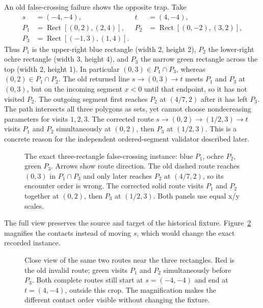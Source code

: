 \documentclass[12pt,a4paper]{article}
\newcommand{\Rect}[2]{\operatorname{Rect}\!\left[#1,#2\right]}
\begin{document}
An old false-crossing failure shows the opposite trap. Take
\[
\begin{aligned}
s&=(-4,-4),&t&=(4,-4),\\
P_1&=\Rect{(0,2)}{(2,4)},&P_2&=\Rect{(0,-2)}{(3,2)},\\
P_3&=\Rect{(-1,3)}{(1,4)}.
\end{aligned}
\]
Thus \(P_1\) is the upper-right blue rectangle (width 2, height 2), \(P_2\) the lower-right ochre rectangle (width 3, height 4), and \(P_3\) the narrow green rectangle across the top (width 2, height 1). In particular \((0,3)\in P_1\cap P_3\), whereas \((0,2)\in P_1\cap P_2\).
The old returned line \(s\to(0,3)\to t\) meets \(P_1\) and \(P_3\) at \((0,3)\), but on the incoming segment \(x<0\) until that endpoint, so it has not visited \(P_2\). The outgoing segment first reaches \(P_2\) at \((4/7,2)\) after it has left \(P_3\). The path intersects all three polygons as sets, yet cannot choose nondecreasing parameters for visits \(1,2,3\). The corrected route \(s\to(0,2)\to(1/2,3)\to t\) visits \(P_1\) and \(P_2\) simultaneously at \((0,2)\), then \(P_3\) at \((1/2,3)\). This is a concrete reason for the independent ordered-segment validator described later.

\begin{figure}[h]\centering\figfalsecrossing\caption{The exact three-rectangle false-crossing instance: blue \(P_1\), ochre \(P_2\), green \(P_3\). Arrows show route direction. The old dashed route reaches \((0,3)\) in \(P_1\cap P_3\) and only later reaches \(P_2\) at \((4/7,2)\), so its encounter order is wrong. The corrected solid route visits \(P_1\) and \(P_2\) together at \((0,2)\), then \(P_3\) at \((1/2,3)\). Both panels use equal x/y scales.}\label{fig:false-crossing}\end{figure}

The full view preserves the source and target of the historical fixture. Figure~\ref{fig:false-crossing-zoom} magnifies the contacts instead of moving \(s\), which would change the exact recorded instance.
\begin{figure}[H]\centering\figfalsecrossingzoom\caption{Close view of the same two routes near the three rectangles. Red is the old invalid route; green visits \(P_1\) and \(P_2\) simultaneously before \(P_3\). Both complete routes still start at \(s=(-4,-4)\) and end at \(t=(4,-4)\), outside this crop. The magnification makes the different contact order visible without changing the fixture.}\label{fig:false-crossing-zoom}\end{figure}
\end{document}
